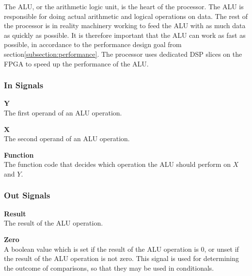 The ALU, or the arithmetic logic unit, is the heart of the processor.
The ALU is responsible for doing actual arithmetic and logical operations on data.
The rest of the processor is in reality machinery working to feed the ALU with as much data as quickly as possible.
It is therefore important that the ALU can work as fast as possible, in accordance to the performance design goal from section\vref{subsection:performance}.
The processor uses dedicated DSP slices on the FPGA to speed up the performance of the ALU.

\subsubsection{In Signals}

\begin{description}
\item{\textbf{Y}} \\
The first operand of an ALU operation.

\item{\textbf{X}} \\
The second operand of an ALU operation.

\item{\textbf{Function}} \\
The function code that decides which operation the ALU should perform on $ X $ and $ Y $.
\end{description}

\subsubsection{Out Signals}

\begin{description}
\item{\textbf{Result}} \\
    The result of the ALU operation.

\item{\textbf{Zero}} \\
    A boolean value which is set if the result of the ALU operation is 0, or unset if the result of the ALU operation is not zero.
    This signal is used for determining the outcome of comparisons, so that they may be used in conditionals.
\end{description}

